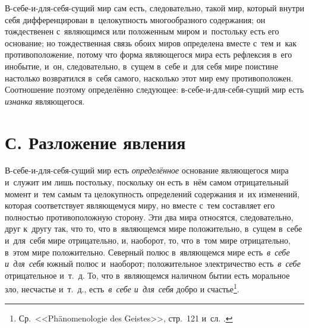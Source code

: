 В-себе-и-для-себя-сущий мир сам есть, следовательно, такой мир, который
внутри себя дифференцирован в~целокупность многообразного содержания; он
тождественен с~являющимся или положенным миром и~постольку есть его
основание; но тождественная связь обоих миров определена вместе с~тем и~как
противоположение, потому что форма являющегося мира есть рефлексия в~его
инобытие, и~он, следовательно, в~сущем в~себе и~для себя мире поистине
настолько возвратился в~себя самого, насколько этот мир ему противоположен.
Соотношение поэтому определённо следующее: в-себе-и-для-себя-сущий мир есть
{\em изнанка} являющегося.


\section[С. Разложение явления]{С. Разложение явления}

В-себе-и-для-себя-сущий мир есть {\em определённое} основание являющегося мира
и~служит им лишь постольку, поскольку он есть в~нём самом отрицательный момент
и~тем самым та целокупность определений содержания и~их изменений, которая
соответствует являющемуся миру, но вместе с~тем составляет его полностью
противоположную сторону. Эти два мира относятся, следовательно, друг к~другу
так, что то, что в~являющемся мире положительно, в~сущем в~себе и~для~себя мире
отрицательно, и, наоборот, то, что в~том мире отрицательно, в~этом мире
положительно. Северный полюс в~являющемся мире есть~{\em в~себе и~для~себя}
южный полюс и~наоборот; положительное электричество есть~{\em в~себе}
отрицательное и~т.~д. То, что в~являющемся наличном бытии есть моральное зло,
несчастье и~т.~д., есть~{\em в~себе и~для~себя} добро и
счастье\footnote{Ср.~<<Phäno\-meno\-logie des Geistes>>, стр.~121 и~сл.
.}.

